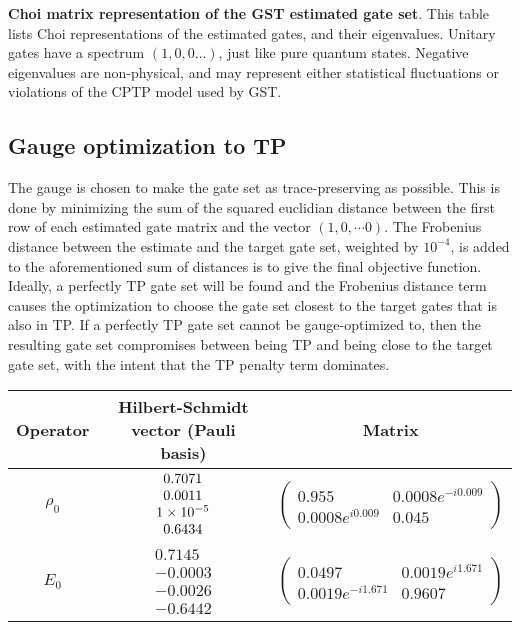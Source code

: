 {\begin{table}[h]
\begin{center}
\caption{\textbf{Choi matrix representation of the GST estimated gate set}.  This table lists Choi representations of the estimated gates, and their eigenvalues.  Unitary gates have a spectrum $(1,0,0\ldots)$, just like pure quantum states.  Negative eigenvalues are non-physical, and may represent either statistical fluctuations or violations of the CPTP model used by GST.\label{bestTargetGatesGatesetChoiTable}}
\end{center}
\end{table}

\clearpage

\subsection{Gauge optimization to TP}
The gauge is chosen to make the gate set as trace-preserving as possible.  This is done by minimizing the sum of the squared euclidian distance between the first row of each estimated gate matrix and the vector $(1,0,\cdots 0)$.  The Frobenius distance between the estimate and the target gate set, weighted by $10^{-4}$, is added to the aforementioned sum of distances is to give the final objective function.  Ideally, a perfectly TP gate set will be found and the Frobenius distance term causes the optimization to choose the gate set closest to the target gates that is also in TP.  If a perfectly TP gate set cannot be gauge-optimized to, then the resulting gate set compromises between being TP and being close to the target gate set, with the intent that the TP penalty term dominates.

\begin{table}[h]
\begin{center}
\begin{tabular}[l]{|c|c|c|}
\hline
Operator & Hilbert-Schmidt vector (Pauli basis) & Matrix \\ \hline
$\rho_{0}$ & $ \begin{array}{c}
0.7071 \\ 
0.0011 \\ 
1\times 10^{-5} \\ 
0.6434
 \end{array} $
 & $ \left(\!\!\begin{array}{cc}
0.955 & 0.0008e^{-i0.009} \\ 
0.0008e^{i0.009} & 0.045
 \end{array}\!\!\right) $
 \\ \hline
$E_{0}$ & $ \begin{array}{c}
0.7145 \\ 
-0.0003 \\ 
-0.0026 \\ 
-0.6442
 \end{array} $
 & $ \left(\!\!\begin{array}{cc}
0.0497 & 0.0019e^{i1.671} \\ 
0.0019e^{-i1.671} & 0.9607
 \end{array}\!\!\right) $
 \\ \hline
\end{tabular}


\end{center}
\end{table}}
